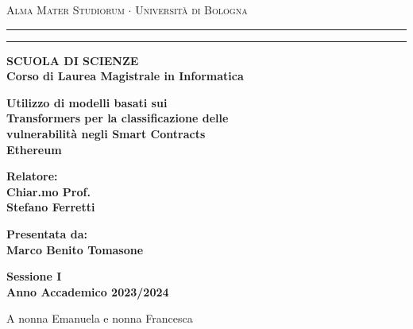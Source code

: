 \documentclass[12pt,a4paper]{report}
\newenvironment{dedication}
{%
\thispagestyle{empty}%
\vspace*{\stretch{1}}%
\itshape             %
\raggedleft          %
}
{\par %
\vspace{\stretch{3}} %
\clearpage           %
}
\begin{document}
\begin{titlepage}
    \begin{center}
    {{\Large{\textsc{Alma Mater Studiorum $\cdot$ Universit\`a di
    Bologna}}}} \rule[0.1cm]{15.8cm}{0.1mm}
    \rule[0.5cm]{15.8cm}{0.6mm}
    {\small{\bf SCUOLA DI SCIENZE\\
    Corso di Laurea Magistrale in Informatica }}
    \end{center}
    \vspace{15mm}
    \begin{center}
    {\LARGE{\bf Utilizzo di modelli basati sui }}\\
    \vspace{3mm}
    {\LARGE{\bf Transformers per la classificazione delle }}\\
    \vspace{3mm}
    {\LARGE{\bf vulnerabilit\`a negli Smart Contracts}}\\
    \vspace{3mm}
    {\LARGE{\bf Ethereum}}\\
    \end{center}
    \vspace{40mm}
    \par
    \noindent
    \begin{minipage}[t]{0.47\textwidth}
    {\large{\bf Relatore:\\
    Chiar.mo Prof.\\
    Stefano Ferretti\\

    }}
    \end{minipage}
    \hfill
    \begin{minipage}[t]{0.47\textwidth}\raggedleft
    {\large{\bf Presentata da:\\
    Marco Benito Tomasone}}
    \end{minipage}
    \vspace{20mm}
    \begin{center}
    {\large{\bf Sessione I\\%
    Anno Accademico 2023/2024}}%
    \end{center}
    \end{titlepage}

    \begin{dedication}
       A nonna Emanuela e nonna Francesca
    \end{dedication}
    \tableofcontents
    \listoffigures
    \listoftables
    
\end{document}
